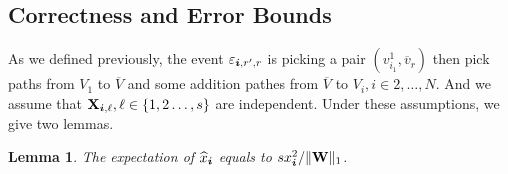 \documentclass[letterpaper]{article}
\newcommand{\V}[1]{{\bm{{\MakeLowercase{#1}}}}}
\newcommand{\M}[1]{{\bm{\mathbf{\MakeUppercase{#1}}}}}
\newcommand{\norm}[2]{\|#1\|_{#2}}
\newtheorem{lemma}{Lemma}
\begin{document}
\subsection{Correctness and Error Bounds}

As we defined previously, the event $\varepsilon_{\V{i},r',r}$ is picking a pair $(v^1_{i_1},\overline{v}_r)$ then pick paths from $V_1$ to $\overline{V}$ and some addition pathes from $\overline{V}$ to $V_i,i\in{2,\ldots,N}$. And we assume that $\M{X}_{\V{i},\ell},\ell\in\{1,2\ldots,s\}$ are independent. Under these assumptions, we give two lemmas.

\begin{lemma}\label{lem:Expectation}
The expectation of $\widehat{x}_{\V{i}}$ equals to $sx^2_{\V{i}}/\norm{\M{W}}{1}$.
\end{lemma}
\end{document}
